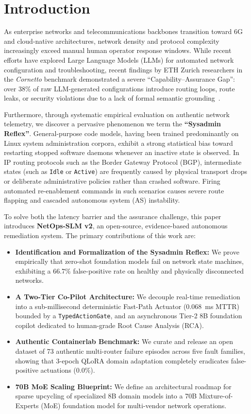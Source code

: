 \documentclass[conference]{IEEEtran}
\begin{document}
\section{Introduction}
As enterprise networks and telecommunications backbones transition toward 6G and cloud-native architectures, network density and protocol complexity increasingly exceed manual human operator response windows. While recent efforts have explored Large Language Models (LLMs) for automated network configuration and troubleshooting, recent findings by ETH Zurich researchers in the \textit{Cornetto} benchmark demonstrated a severe ``Capability--Assurance Gap'': over 38\% of raw LLM-generated configurations introduce routing loops, route leaks, or security violations due to a lack of formal semantic grounding~\cite{cornetto2024}.

Furthermore, through systematic empirical evaluation on authentic network telemetry, we discover a pervasive phenomenon we term the \textbf{``Sysadmin Reflex''}. General-purpose code models, having been trained predominantly on Linux system administration corpora, exhibit a strong statistical bias toward restarting stopped software daemons whenever an inactive state is observed. In IP routing protocols such as the Border Gateway Protocol (BGP), intermediate states (such as \texttt{Idle} or \texttt{Active}) are frequently caused by physical transport drops or deliberate administrative policies rather than crashed software. Firing automated re-enablement commands in such scenarios causes severe route flapping and cascaded autonomous system (AS) instability.

To solve both the latency barrier and the assurance challenge, this paper introduces \textbf{NetOps-SLM v2}, an open-source, evidence-based autonomous remediation system. The primary contributions of this work are:
\begin{itemize}
    \item \textbf{Identification and Formalization of the Sysadmin Reflex:} We prove empirically that zero-shot foundation models fail on network state machines, exhibiting a 66.7\% false-positive rate on healthy and physically disconnected networks.
    \item \textbf{A Two-Tier Co-Pilot Architecture:} We decouple real-time remediation into a sub-millisecond deterministic Fast-Path Actuator (0.068~ms MTTR) bounded by a \texttt{TypedActionGate}, and an asynchronous Tier-2 8B foundation copilot dedicated to human-grade Root Cause Analysis (RCA).
    \item \textbf{Authentic Containerlab Benchmark:} We curate and release an open dataset of 73 authentic multi-router failure episodes across five fault families, showing that 3-epoch QLoRA domain adaptation completely eradicates false-positive actuations (0.0\%).
    \item \textbf{70B MoE Scaling Blueprint:} We define an architectural roadmap for sparse upcycling of specialized 8B domain models into a 70B Mixture-of-Experts (MoE) foundation model for multi-vendor network operations.
\end{itemize}
\end{document}
